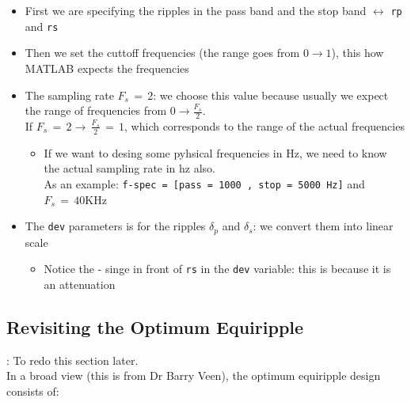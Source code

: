 \begin{itemize}

\item First we are specifying the ripples in the pass band and the stop band $\leftrightarrow$ \verb|rp| and  \verb|rs|

\item Then we set the cuttoff frequencies  (the range goes from $0 \rightarrow 1$), this how MATLAB expects the frequencies

\item The sampling rate $F_s \, = \, 2$: we choose this value because usually we expect the range of frequencies from $0 \rightarrow \displaystyle\frac{F_s}{2}$.\\

If $F_s \, = \, 2 \rightarrow \,\displaystyle\frac{F_s}{2} \, = \, 1$, which corresponds to the range of the actual frequencies

    \begin{itemize}
        \item If we want to desing some pyhsical frequencies in Hz, we need to know the actual sampling rate in hz also.\\
        
        As an example: \verb|f-spec = [pass = 1000 , stop = 5000 Hz]| and $F_s \, = \, 40$KHz
    \end{itemize}

\item The \verb|dev| parameters is for the ripples $\delta_p$ and $\delta_s$: we convert them into linear scale

    \begin{itemize}
        \item Notice the - singe in front of \verb|rs| in the \verb|dev| variable: this is because it is an attenuation
    \end{itemize}


\end{itemize}

\subsection{Revisiting the Optimum Equiripple}

: To redo this section later.\\

In a broad view (this is from Dr Barry Veen), the optimum equiripple design consists of:

